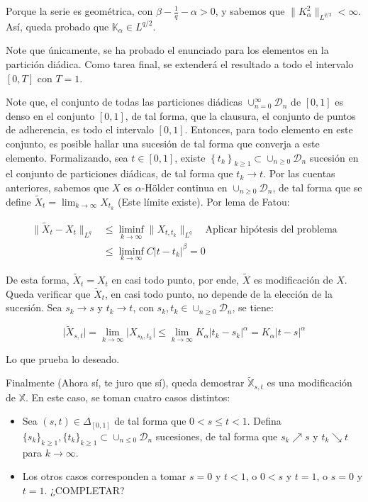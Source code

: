 Porque la serie es geométrica, con $\beta - \frac{1}{q} - \alpha > 0$, y sabemos que $\lVert K^2_{\alpha} \rVert_{L^{q/2}} < \infty$. Así, queda probado que $\mathbb{K}_{\alpha} \in L^{q/2}$.

Note que únicamente, se ha probado el enunciado para los elementos en la partición diádica. Como tarea final, se extenderá el resultado a todo el intervalo $[0, T]$ con $T = 1$.

Note que, el conjunto de todas las particiones diádicas $\cup_{n = 0}^{\infty} \mathcal{D}_n$ de $[0,1]$ es denso en el conjunto $[0, 1]$, de tal forma, que la clausura, el conjunto de puntos de adherencia, es todo el intervalo $[0, 1]$. Entonces, para todo elemento en este conjunto, es posible hallar una sucesión de tal forma que converja a este elemento. Formalizando, sea $t \in [0, 1]$, existe $\left\{ t_k \right\}_{k \geq 1} \subset \cup_{n \geq 0} \mathcal{D}_n$ sucesión en el conjunto de particiones diádicas, de tal forma que $t_k \rightarrow t$. Por las cuentas anteriores, sabemos que $X$ es $\alpha$-Hölder continua en $\cup_{n \geq 0} \mathcal{D}_n$, de tal forma que se define $\tilde{X}_t = \lim_{k \rightarrow \infty} X_{t_k}$ (Este límite existe). Por lema de Fatou:

\begin{align*}
	\lVert \tilde{X}_t - X_t \rVert_{L^q} &\leq \liminf_{k\rightarrow \infty} \lVert X_{t, t_k}\rVert_{L^q} \quad \text{Aplicar hipótesis del problema} \\
	&\leq \liminf_{k\rightarrow \infty} C \lvert t - t_k \rvert^{\beta} = 0
\end{align*}

De esta forma, $\tilde{X}_t = X_t$ en casi todo punto, por ende, $\tilde{X}$ es modificación de $X$. Queda verificar que $\tilde{X}_t$, en casi todo punto, no depende de la elección de la sucesión. Sea $s_k \rightarrow s$ y $t_k \rightarrow t$, con $s_k, t_k \in \cup_{n \geq 0} \mathcal{D}_n$, se tiene:

\[
	\lvert \tilde{X}_{s,t} \rvert = \lim_{k \rightarrow \infty} \lvert X_{s_k, t_k} \rvert \leq \lim_{k \rightarrow \infty} K_{\alpha} \lvert t_k - s_k \rvert^{\alpha} = K_{\alpha} \lvert t - s \rvert^{\alpha}
\]

Lo que prueba lo deseado.

Finalmente (Ahora sí, te juro que sí), queda demostrar $\tilde{\mathbb{X}}_{s,t}$ es una modificación de $\mathbb{X}$. En este caso, se toman cuatro casos distintos:

\begin{itemize}

	\item Sea $(s,t) \in \Delta_{[0,1]}$ de tal forma que $0 < s \leq t < 1$. Defina $\{ s_k \}_{k \geq 1}, \{ t_k \}_{k \geq 1} \subset \cup_{n \leq 0} \mathcal{D}_n$ sucesiones, de tal forma que $s_k \nearrow s$ y $t_k \searrow t$ para $k \rightarrow \infty$. 

	\item Los otros casos corresponden a tomar $s = 0$ y $t < 1$, o $0 < s$ y $t = 1$, o $s = 0$ y $t = 1$. ¿COMPLETAR?

\end{itemize}

